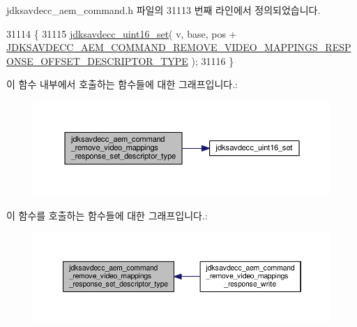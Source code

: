jdksavdecc\+\_\+aem\+\_\+command.\+h 파일의 31113 번째 라인에서 정의되었습니다.


\begin{DoxyCode}
31114 \{
31115     \hyperlink{group__endian_ga14b9eeadc05f94334096c127c955a60b}{jdksavdecc\_uint16\_set}( v, base, pos + 
      \hyperlink{group__command__remove__video__mappings__response_gaba6e54367591f5ec123c801f27317370}{JDKSAVDECC\_AEM\_COMMAND\_REMOVE\_VIDEO\_MAPPINGS\_RESPONSE\_OFFSET\_DESCRIPTOR\_TYPE}
       );
31116 \}
\end{DoxyCode}


이 함수 내부에서 호출하는 함수들에 대한 그래프입니다.\+:
\nopagebreak
\begin{figure}[H]
\begin{center}
\leavevmode
\includegraphics[width=350pt]{group__command__remove__video__mappings__response_gac36d1e32e8ab7058b210d27a12695c54_cgraph}
\end{center}
\end{figure}




이 함수를 호출하는 함수들에 대한 그래프입니다.\+:
\nopagebreak
\begin{figure}[H]
\begin{center}
\leavevmode
\includegraphics[width=350pt]{group__command__remove__video__mappings__response_gac36d1e32e8ab7058b210d27a12695c54_icgraph}
\end{center}
\end{figure}


